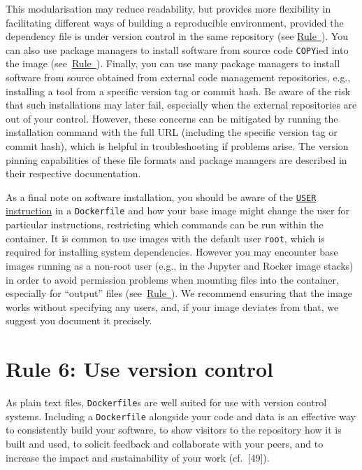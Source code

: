 \documentclass[10pt,letterpaper]{article}
\begin{document}
This modularisation may reduce readability, but provides more
flexibility in facilitating different ways of building a reproducible
environment, provided the dependency file is under version control in
the same repository (see
\hyperref[{rule:publish}]{Rule~}). You can also
use package managers to install software from source code
\texttt{COPY}ied into the image
(see~\hyperref[{rule:mount}]{Rule~}). Finally, you
can use many package managers to install software from source obtained
from external code management repositories, e.g., installing a tool from
a specific version tag or commit hash. Be aware of the risk that such
installations may later fail, especially when the external repositories
are out of your control. However, these concerns can be mitigated by
running the installation command with the full URL (including the
specific version tag or commit hash), which is helpful in
troubleshooting if problems arise. The version pinning capabilities of
these file formats and package managers are described in their
respective documentation.

As a final note on software installation, you should be aware of the
\href{https://docs.docker.com/engine/reference/builder/\#user}{\texttt{USER}
instruction} in a \texttt{Dockerfile} and how your base image might
change the user for particular instructions, restricting which commands
can be run within the container. It is common to use images with the
default user \texttt{root}, which is required for installing system
dependencies. However you may encounter base images running as a
non-root user (e.g., in the Jupyter and Rocker image stacks) in order to
avoid permission problems when mounting files into the container,
especially for ``output'' files
(see~\hyperref[{rule:mount}]{Rule~}). We recommend
ensuring that the image works without specifying any users, and, if your
image deviates from that, we suggest you document it precisely.

\hypertarget{rule-6-use-version-control}{%
\section*{Rule 6: Use version
control}\label{rule-6-use-version-control}}

  \label{rule:publish} 

As plain text files, \texttt{Dockerfile}s are well suited for use with
version control systems. Including a \texttt{Dockerfile} alongside your
code and data is an effective way to consistently build your software,
to show visitors to the repository how it is built and used, to solicit
feedback and collaborate with your peers, and to increase the impact and
sustainability of your work (cf.~{[}49{]}).
\end{document}
